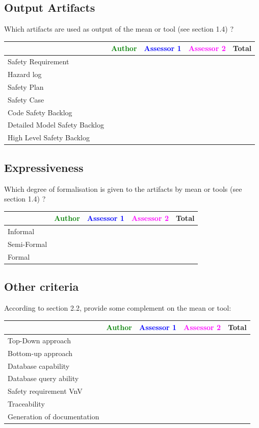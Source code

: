 \subsection{Output Artifacts}

Which artifacts are used as output of the mean or tool (see \citep{D4.2.a} section 1.4) ? 


\begin{tabular}{|l | c | c | c | c|}
\hline
& \textcolor{green}{Author} & \textcolor{blue}{Assessor 1} & \textcolor{magenta}{Assessor 2} & Total \\
\hline 
Safety Requirement & & & &  \\
\hline
Hazard log & & & & \\
\hline
Safety Plan & & & & \\
\hline
Safety Case & & & & \\
\hline
Code Safety Backlog & & & &  \\
\hline
Detailed Model Safety Backlog & & & & \\
\hline
High Level Safety Backlog & & & & \\
\hline
\end{tabular}

\subsection{Expressiveness}


Which degree of formalisation is given to the artifacts by mean or tools (see \citep{D4.2.a} section 1.4) ? 


\begin{tabular}{|l | c | c | c | c|}
\hline
& \textcolor{green}{Author} & \textcolor{blue}{Assessor 1} & \textcolor{magenta}{Assessor 2} & Total \\
\hline 
Informal & & & &  \\
\hline
Semi-Formal & & & & \\
\hline
Formal & & & & \\
\hline
\end{tabular}


\subsection{Other criteria}
According to \citep{D4.2.a} section 2.2, provide some complement on the mean or tool:


\begin{tabular}{|l | c | c | c | c|}
\hline
& \textcolor{green}{Author} & \textcolor{blue}{Assessor 1} & \textcolor{magenta}{Assessor 2} & Total \\
\hline 
Top-Down approach  & & & &  \\
\hline
Bottom-up approach & & & & \\
\hline
Database capability & & & & \\
\hline
Database query ability & & & & \\
\hline
Safety requirement VnV & & & & \\
\hline
Traceability & & & & \\
\hline
Generation of documentation & & & & \\
\hline
\end{tabular}


